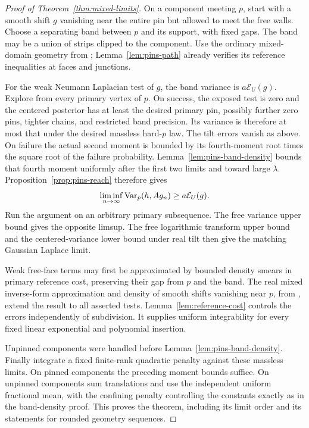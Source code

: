 \begin{proof}[Proof of Theorem~\ref{thm:mixed-limits}]
On a component meeting \(p\), start with a smooth shift
\(g\) vanishing near the entire pin but allowed to meet
the free walls. Choose a separating band between \(p\)
and its support, with fixed gaps. The band may be a
union of strips clipped to the component. Use the
ordinary mixed-domain geometry from ;
Lemma~\ref{lem:pins-path} already verifies its reference
inequalities at faces and junctions.

For the weak Neumann Laplacian test of \(g\), the band
variance is \(a\mathcal E_U(g)\).
Explore from every primary vertex of \(p\).
On success, the exposed test is zero and the centered
posterior has at least the desired primary pin, possibly
further zero pins, tighter chains, and restricted band
precision. Its variance is therefore at most that under
the desired massless hard-\(p\) law.
The tilt errors vanish as above. On failure the actual
second moment is bounded by its fourth-moment root
times the square root of the failure probability.
Lemma~\ref{lem:pins-band-density} bounds that fourth
moment uniformly after the first two limits and toward
large \(\lambda\). Proposition~\ref{prop:pins-reach}
therefore gives
\[
 \liminf_{n\to\infty}\operatorname{Var}_p(h,A g_n)
                  \ge a\mathcal E_U(g).
\]
Run the argument on an arbitrary primary subsequence.
The free variance upper bound gives the opposite
limsup. The free logarithmic transform upper bound
and the centered-variance lower bound under real tilt
then give the matching Gaussian Laplace limit.

Weak free-face terms may first be approximated by
bounded density smears in primary reference cost,
preserving their gap from \(p\) and the band.
The real mixed inverse-form approximation and density
of smooth shifts vanishing near \(p\), from
, extend the result to all asserted
tests. Lemma~\ref{lem:reference-cost} controls the
errors independently of subdivision. It supplies
uniform integrability for every fixed linear
exponential and polynomial insertion.

Unpinned components were handled before
Lemma~\ref{lem:pins-band-density}. Finally integrate
a fixed finite-rank quadratic penalty against these
massless limits. On pinned components the preceding
moment bounds suffice. On unpinned components sum
translations and use the independent uniform
fractional mean, with the confining penalty controlling
the constants exactly as in the band-density proof.
This proves the theorem, including its limit order
and its statements for rounded geometry sequences.
\end{proof}

